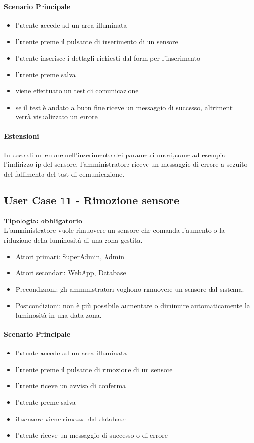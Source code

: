 \documentclass[12pt]{article}
\begin{document}
\paragraph{Scenario Principale}
\begin{itemize}
	\item l'utente accede ad un area illuminata
	\item l'utente preme il pulsante di inserimento di un sensore
	\item l'utente inserisce i dettagli richiesti dal form per l'inserimento
	\item l'utente preme salva
	\item viene effettuato un test di comunicazione
	\item se il test è andato a buon fine riceve un messaggio di successo, altrimenti verrà visualizzato un errore
\end{itemize}
\paragraph{Estensioni} In caso di un errore nell'inserimento dei parametri nuovi,come ad esempio l'indirizzo ip del sensore,  l'amministratore riceve un messaggio di errore a seguito del fallimento del test di comunicazione.

\subsection{User Case 11 - Rimozione sensore}
\textbf{Tipologia: obbligatorio}\\
L'amministratore vuole rimuovere un sensore che comanda l'aumento o la riduzione della luminosità di una zona gestita.
\begin{itemize}
	\item Attori primari: SuperAdmin, Admin
	\item Attori secondari: WebApp, Database
	\item Precondizioni: gli amministratori vogliono rimuovere un sensore dal sistema.\\
	\item Postcondizioni: non è più possibile aumentare o diminuire automaticamente la luminosità in una data zona.
\end{itemize}
\paragraph{Scenario Principale}
\begin{itemize}
	\item l'utente accede ad un area illuminata
	\item l'utente preme il pulsante di rimozione di un sensore
	\item l'utente riceve un avviso di conferma
	\item l'utente preme salva
	\item il sensore viene rimosso dal database
	\item l'utente riceve un messaggio di successo o di errore
\end{itemize}
\end{document}
